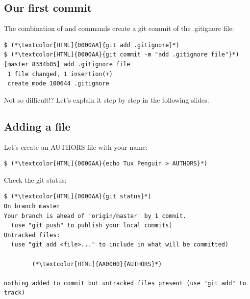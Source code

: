 \subsection{Our first commit}
\begin{frame}[fragile]
  \subslidetitle

  The combination of  and  commands create a git commit of the .gitignore file:
  \begin{lstlisting}
$ (*\textcolor[HTML]{0000AA}{git add .gitignore}*)
$ (*\textcolor[HTML]{0000AA}{git commit -m "add .gitignore file"}*)
[master 8334b05] add .gitignore file
 1 file changed, 1 insertion(+)
 create mode 100644 .gitignore
\end{lstlisting}

Not so difficult!? Let's explain it step by step in the following slides.
\end{frame}

\subsection{Adding a file}
\begin{frame}[fragile]
  \subslidetitle

  Let's create an AUTHORS file with your name:
  \begin{lstlisting}
$ (*\textcolor[HTML]{0000AA}{echo Tux Penguin > AUTHORS}*)
\end{lstlisting}

  Check the git status:
  \begin{lstlisting}
$ (*\textcolor[HTML]{0000AA}{git status}*)
On branch master
Your branch is ahead of 'origin/master' by 1 commit.
  (use "git push" to publish your local commits)
Untracked files:
  (use "git add <file>..." to include in what will be committed)

        (*\textcolor[HTML]{AA0000}{AUTHORS}*)

nothing added to commit but untracked files present (use "git add" to track)
\end{lstlisting}

\end{frame}

